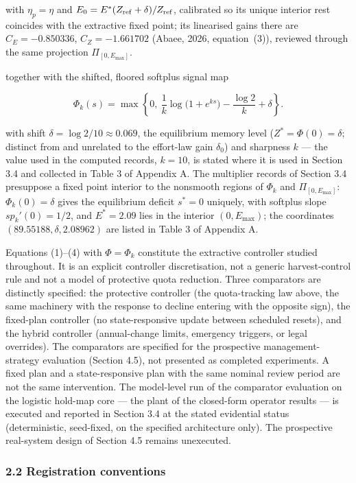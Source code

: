\documentclass[11pt]{article}
\begin{document}
with \(\eta_p = \eta\) and \(E_0 = E^*(Z_{\rm ref}+\delta)/Z_{\rm ref}\), calibrated so its unique interior rest coincides with the extractive fixed point; its linearised gains there are \(C_E = -0.850336\), \(C_Z = -1.661702\) (Abaee, 2026, equation~(3)), reviewed through the same projection \(\Pi_{[0,E_{\max}]}\).

together with the shifted, floored softplus signal map

\[
\Phi_k(s)=\max\left\{0,\ \frac{1}{k}\log\!\bigl(1+e^{ks}\bigr)-\frac{\log 2}{k}+\delta\right\}.
\]

with shift \(\delta = \log 2/10 \approx 0.069\), the equilibrium memory level (\(Z^* = \Phi(0) = \delta\); distinct from
and unrelated to the effort-law gain \(\delta_0\)) and sharpness \(k\)
--- the value used in the computed records, \(k = 10\), is stated where it is used in Section 3.4 and collected in Table 3 of Appendix A. The
multiplier records of Section 3.4 presuppose a fixed point interior to
the nonsmooth regions of \(\Phi_k\) and \(\Pi_{[0,E_{\max}]}\):
\(\Phi_k(0) = \delta\) gives the equilibrium deficit \(s^* = 0\)
uniquely, with softplus slope \(sp_k'(0) = 1/2\), and \(E^* = 2.09\)
lies in the interior \((0, E_{\max})\); the coordinates
\((89.55188, \delta, 2.08962)\) are listed in Table 3 of Appendix A.

Equations (1)--(4) with \(\Phi=\Phi_k\) constitute the extractive
controller studied throughout. It is an explicit controller
discretisation, not a generic harvest-control rule and not a model of
protective quota reduction. Three comparators are distinctly specified: the protective controller (the quota-tracking law above, the same machinery with the
response to decline entering with the opposite sign), the fixed-plan
controller (no state-responsive update between scheduled resets), and
the hybrid controller (annual-change limits, emergency triggers, or
legal overrides). The comparators are specified for the prospective
management-strategy evaluation (Section 4.5), not presented as completed
experiments. A fixed plan and a state-responsive plan with the same
nominal review period are not the same intervention. The model-level run
of the comparator evaluation on the logistic hold-map core --- the plant
of the closed-form operator results --- is executed and reported in
Section 3.4 at the stated evidential status (deterministic,
seed-fixed, on the specified architecture only). The prospective
real-system design of Section 4.5 remains unexecuted.

\subsubsection{2.2 Registration
conventions}\label{registration-conventions}
\end{document}
